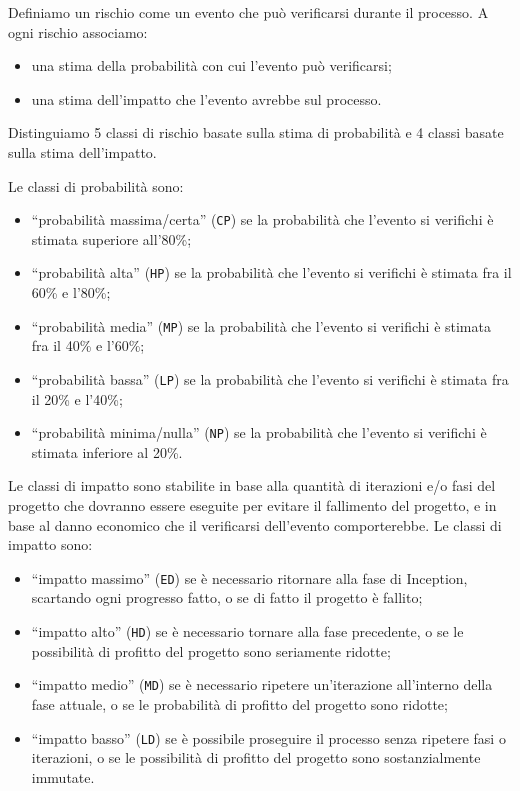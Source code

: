 \documentclass[10pt]{softeng} %
\newcommand{\code}[1]{\texttt{#1}}
\begin{document}
Definiamo un rischio come un evento che pu\`o verificarsi durante il processo.
A ogni rischio associamo:
\begin{itemize}
	\item una stima della probabilit\`a con cui l'evento pu\`o verificarsi;
	\item una stima dell'impatto che l'evento avrebbe sul processo.
\end{itemize}
Distinguiamo 5 classi di rischio basate sulla stima di probabilit\`a e 4 classi basate sulla stima dell'impatto.

Le classi di probabilit\`a sono:
\begin{itemize}
	\item ``probabilit\`a massima/certa'' (\code{CP}) se la probabilit\`a che l'evento si verifichi \`e stimata superiore all'80\%;
	\item ``probabilit\`a alta'' (\code{HP}) se la probabilit\`a che l'evento si verifichi \`e stimata fra il 60\% e l'80\%;
	\item ``probabilit\`a media'' (\code{MP}) se la probabilit\`a che l'evento si verifichi \`e stimata fra il 40\% e l'60\%;
	\item ``probabilit\`a bassa'' (\code{LP}) se la probabilit\`a che l'evento si verifichi \`e stimata fra il 20\% e l'40\%;
	\item ``probabilit\`a minima/nulla'' (\code{NP}) se la probabilit\`a che l'evento si verifichi \`e stimata inferiore al 20\%.
\end{itemize}

Le classi di impatto sono stabilite in base alla quantit\`a di iterazioni e/o fasi del progetto che dovranno essere eseguite per evitare il fallimento del progetto, e in base al danno economico che il verificarsi dell'evento comporterebbe.
Le classi di impatto sono:
\begin{itemize}
	\item ``impatto massimo'' (\code{ED}) se \`e necessario ritornare alla fase di Inception, scartando ogni progresso fatto, o se di fatto il progetto \`e fallito;
	\item ``impatto alto'' (\code{HD}) se \`e necessario tornare alla fase precedente, o se le possibilit\`a di profitto del progetto sono seriamente ridotte;
	\item ``impatto medio'' (\code{MD}) se \`e necessario ripetere un'iterazione all'interno della fase attuale, o se le probabilit\`a di profitto del progetto sono ridotte;
	\item ``impatto basso'' (\code{LD}) se \`e possibile proseguire il processo senza ripetere fasi o iterazioni, o se le possibilit\`a di profitto del progetto sono sostanzialmente immutate.
\end{itemize}
\end{document}
